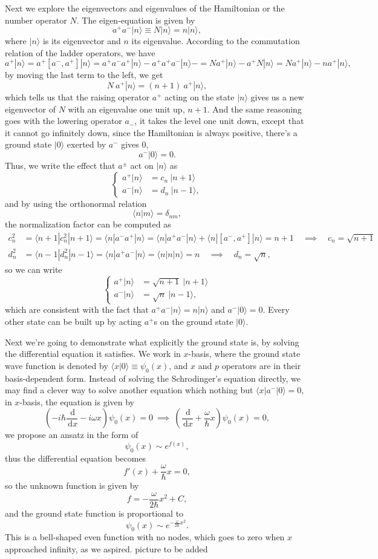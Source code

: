 \documentclass{article}
\newcommand{\be}{\begin{equation}}
\newcommand{\ee}{\end{equation}}
\newcommand{\dif}{\,\mathrm{d}}
\renewcommand{\1}{\left}
\renewcommand{\2}{\right}
\newcommand{\la}{\langle}
\newcommand{\ra}{\rangle}
\newcommand{\om}{\omega}
\newcommand{\del}{\delta}
\begin{document}
Next we explore the eigenvectors and eigenvalues of the Hamiltonian or the number operator $N$. The eigen-equation is given by
\be
a^+a^-|n\ra\equiv N|n\ra=n|n\ra,
\ee
where $|n\ra$ is its eigenvector and $n$ its eigenvalue. According to the commutation relation of the ladder operators, we have
\be
a^+|n\ra=a^+[a^-,a^+]|n\ra=a^+a^-a^+|n\ra-a^+a^+a^-|n\ra-=Na^+|n\ra-a^+N|n\ra=Na^+|n\ra-na^+|n\ra,
\ee
by moving the last term to the left, we get
\be
N\ a^+|n\ra=(n+1)\ a^+|n\ra,
\ee
which tells us that the raising operator $a^+$ acting on the state $|n\ra$ gives us a new eigenvector of $N$ with an eigenvalue one unit up, $n+1$. And the same reasoning goes with the lowering operator $a_-$, it takes the level one unit down, except that it cannot go infinitely down, since the Hamiltonian is always positive, there's a ground state $|0\ra$ exerted by $a^-$ gives $0$,
\be
a^-|0\ra=0.
\ee
Thus, we write the effect that $a^\pm$ act on $|n\ra$ as
\be\1\{\begin{split}
a^+|n\ra&=c_n\ |n+1\ra\\
a^-|n\ra&=d_n\ |n-1\ra,
\end{split}\2.\ee
and by using the orthonormal relation 
\be
\la n|m\ra=\del_{nm},
\ee
the normalization factor can be computed as
\be\begin{split}
c_n^2&=\la n+1|c_n^2|n+1\ra=\la n|a^-a^+|n\ra=\la n|a^+a^-|n\ra+\la n|[a^-,a^+]|n\ra=n+1\quad\implies\quad c_n=\sqrt{n+1}\\
d_n^2&=\la n-1|d_n^2|n-1\ra=\la n|a^+a^-|n\ra=\la n|n|n\ra=n\quad\implies\quad d_n=\sqrt{n},
\end{split}\ee
so we can write 
\be\1\{\begin{split}
a^+|n\ra&=\sqrt{n+1}\ |n+1\ra\\
a^-|n\ra&=\sqrt{n}\ |n-1\ra,
\end{split}\2.\ee
which are consistent with the fact that $a^+a^-|n\ra=n|n\ra$ and $a^-|0\ra=0$. Every other state can be built up by acting $a^+$s on the ground state $|0\ra$. 

Next we're going to demonstrate what explicitly the ground state is, by solving the differential equation it satisfies. We work in $x$-basis, where the ground state wave function is denoted by $\la x|0\ra \equiv \psi_0(x)$, and $x$ and $p$ operators are in their basis-dependent form. Instead of solving the Schrodinger's equation directly, we may find a clever way to solve another equation which nothing but $\la x|a^-|0\ra=0$, in $x$-basis, the equation is given by
\be
\1(-i\hbar\frac{\dif}{\dif x}-i\om x\2)\psi_0(x)=0 \ \implies\ \1(\frac{\dif}{\dif x}+\frac\om\hbar x\2)\psi_0(x)=0,
\ee
we propose an ansatz in the form of 
\be
\psi_0(x)\sim e^{f(x)},
\ee
thus the differential equation becomes
\be
f'(x)+\frac\om\hbar x=0,
\ee
so the unknown function is given by
\be
f=-\frac\om{2\hbar} x^2 +C,
\ee
and the ground state function is proportional to 
\be
\psi_0(x)\sim e^{-\frac\om{2\hbar} x^2}.
\ee
This is a bell-shaped even function with no nodes, which goes to zero when $x$ approached infinity, as we aspired. picture to be added
\end{document}

